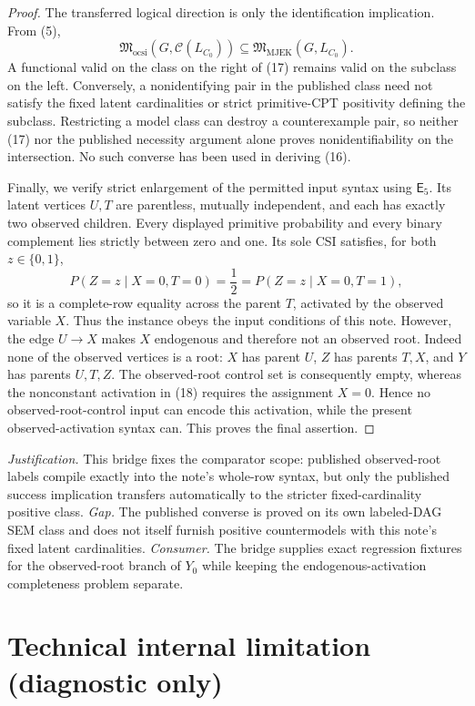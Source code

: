 \documentclass{article}
\begin{document}
\begin{proof}
The transferred logical direction is only the identification implication.  From (5),
\[
\mathfrak M_{\mathrm{ocsi}}\!\left(G,\mathcal C(L_{C_0})\right)
\subseteq\mathfrak M_{\mathrm{MJEK}}(G,L_{C_0}).
\tag{17}
\]
A functional valid on the class on the right of (17) remains valid on the subclass on the left.  Conversely, a nonidentifying pair in the published class need not satisfy the fixed latent cardinalities or strict primitive-CPT positivity defining the subclass.  Restricting a model class can destroy a counterexample pair, so neither (17) nor the published necessity argument alone proves nonidentifiability on the intersection.  No such converse has been used in deriving (16).

Finally, we verify strict enlargement of the permitted input syntax using \(\mathsf E_5\).  Its latent vertices \(U,T\) are parentless, mutually independent, and each has exactly two observed children.  Every displayed primitive probability and every binary complement lies strictly between zero and one.  Its sole CSI satisfies, for both \(z\in\{0,1\}\),
\[
P(Z=z\mid X=0,T=0)=\frac12
=P(Z=z\mid X=0,T=1),
\tag{18}
\]
so it is a complete-row equality across the parent \(T\), activated by the observed variable \(X\).  Thus the instance obeys the input conditions of this note.  However, the edge \(U\to X\) makes \(X\) endogenous and therefore not an observed root.  Indeed none of the observed vertices is a root: \(X\) has parent \(U\), \(Z\) has parents \(T,X\), and \(Y\) has parents \(U,T,Z\).  The observed-root control set is consequently empty, whereas the nonconstant activation in (18) requires the assignment \(X=0\).  Hence no observed-root-control input can encode this activation, while the present observed-activation syntax can.  This proves the final assertion.
\end{proof}
\par\smallskip\noindent \textit{Justification.} This bridge fixes the comparator scope: published observed-root labels compile exactly into the note's whole-row syntax, but only the published success implication transfers automatically to the stricter fixed-cardinality positive class. \textit{Gap.} The published converse is proved on its own labeled-DAG SEM class and does not itself furnish positive countermodels with this note's fixed latent cardinalities. \textit{Consumer.} The bridge supplies exact regression fixtures for the observed-root branch of \(Y_0\) while keeping the endogenous-activation completeness problem separate.

\section*{Technical internal limitation (diagnostic only)}
\end{document}

